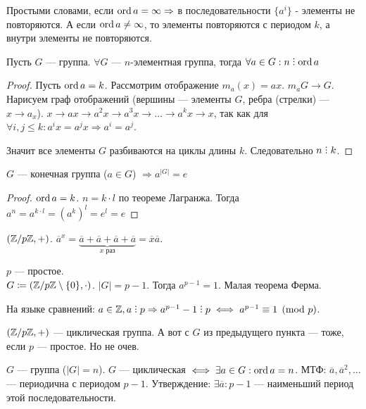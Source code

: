 \slashn
Простыми словами, если $\operatorname{ord} a = \infty \Rightarrow$ в последовательности $\{a^i\}$ - элементы не повторяются. А если  $\operatorname{ord} a \neq \infty$, то элементы повторяются с периодом $k$, а внутри элементы не повторяются. 
\begin{theorem}
    Пусть $G$ --- группа.  $\forall G$ ---  $n$-элементная группа, тогда  $\forall a \in G: n \divby \ord a$
\end{theorem}
\begin{proof}
    Пусть $\operatorname{ord} a = k$.
    Рассмотрим отображение $m_a(x) = ax$. $m_a G \to G$. Нарисуем граф отображений (вершины --- элементы $G$, ребра (стрелки) ---  $x \to a_x$). $x \to ax \to a^2x \to a^3x \to \ldots \to a^kx \to x$, так как для $\forall i, j \le k: a^i x = a^j x \Rightarrow a^i = a^j$. 

    Значит все элементы $G$ разбиваются на циклы длины  $k$. Следовательно $n \divby k$.
\end{proof}
\begin{consequence}
    $G$ --- конечная группа ($a \in G$) $\Rightarrow a^{|G|} = e$
\end{consequence}
\begin{proof}
    $\operatorname{ord} a = k$.  $n = k \cdot l$ по теореме Лагранжа. Тогда  $a^n = a^{k\cdot l} = \left(a^k\right)^l = e^l = e$
\end{proof}
\begin{example}
    $(\mathbb{Z} / p\mathbb{Z}, +)$. $\overline{a}^x = \underbrace{\overline{a} + \overline{a} + \overline{a} + \overline{a}}_{x\text{ раз}} = \overline{x}\overline{a}$.
\end{example}
\begin{example}
    $p$ --- простое.\\
    $G \coloneqq (\mathbb{Z} / p\mathbb{Z} \setminus \{0\}, \cdot) $. $|G| = p - 1$. Тогда $a^{p-1} = 1$. Малая теорема Ферма. 
\end{example}
\slashn
На языке сравнений: $a \in \Z, a \divby p \Rightarrow a^{p-1} - 1 \divby p \iff a^{p-1} \equiv 1 \pmod{p}$. 
 \begin{example}
     $(\mathbb{Z} / p\mathbb{Z}, +)$ --- циклическая группа. А вот с  $G$ из предыдущего пункта --- тоже, если $p$ --- простое. Но не очев.  
\end{example}
\begin{statement}
    $G$ --- группа ($|G|=n$). $G$ --- циклическая  $\iff \exists a \in G: \operatorname{ord} a = n$.  
    МТФ: $\overline{a}, \overline{a}^2,\ldots$ --- периодична с периодом $p-1$. Утверждение:  $\exists \overline{a}: p-1$ --- наименьший период этой последовательности.
\end{statement}
